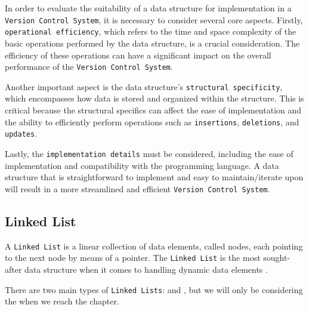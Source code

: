 In order to evaluate the suitability of a data structure for implementation in a \lstinline{Version Control System}, it is necessary to consider several core aspects. Firstly, \lstinline{operational efficiency}, which refers to the time and space complexity of the basic operations performed by the data structure, is a crucial consideration. The efficiency of these operations can have a significant impact on the overall performance of the \lstinline{Version Control System}.
\smallskip

Another important aspect is the data structure's \lstinline{structural specificity}, which encompasses how data is stored and organized within the structure. This is critical because the structural specifics can affect the ease of implementation and the ability to efficiently perform operations such as \lstinline{insertions}, \lstinline{deletions}, and \lstinline{updates}.
\smallskip

Lastly, the \lstinline{implementation details} must be considered, including the ease of implementation and compatibility with the programming language. A data structure that is straightforward to implement and easy to maintain/iterate upon will result in a more streamlined and efficient \lstinline{Version Control System}.
% 
% 
\subsection{Linked List}
\label{sec:linked-list}
A \lstinline{Linked List} is a linear collection of data elements, called nodes, each pointing to the next node by means of a pointer. The \lstinline{Linked List} is the most sought-after data structure when it comes to handling dynamic data elements \cite{ravikiran_linked_list}.
\smallskip

There are two main types of \lstinline{Linked Lists}:  and , but we will only be considering the  when we reach the  chapter.
